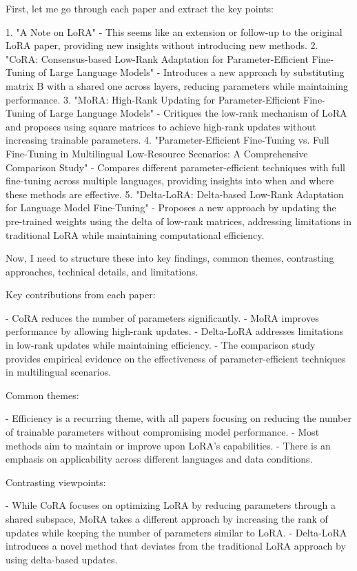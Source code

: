 \documentclass[conference]{IEEEtran}
\begin{document}
First, let me go through each paper and extract the key points:

1. "A Note on LoRA" - This seems like an extension or follow-up to the original LoRA paper, providing new insights without introducing new methods.
2. "CoRA: Consensus-based Low-Rank Adaptation for Parameter-Efficient Fine-Tuning of Large Language Models" - Introduces a new approach by substituting matrix B with a shared one across layers, reducing parameters while maintaining performance.
3. "MoRA: High-Rank Updating for Parameter-Efficient Fine-Tuning of Large Language Models" - Critiques the low-rank mechanism of LoRA and proposes using square matrices to achieve high-rank updates without increasing trainable parameters.
4. "Parameter-Efficient Fine-Tuning vs. Full Fine-Tuning in Multilingual Low-Resource Scenarios: A Comprehensive Comparison Study" - Compares different parameter-efficient techniques with full fine-tuning across multiple languages, providing insights into when and where these methods are effective.
5. "Delta-LoRA: Delta-based Low-Rank Adaptation for Language Model Fine-Tuning" - Proposes a new approach by updating the pre-trained weights using the delta of low-rank matrices, addressing limitations in traditional LoRA while maintaining computational efficiency.

Now, I need to structure these into key findings, common themes, contrasting approaches, technical details, and limitations.

Key contributions from each paper:

- CoRA reduces the number of parameters significantly.
- MoRA improves performance by allowing high-rank updates.
- Delta-LoRA addresses limitations in low-rank updates while maintaining efficiency.
- The comparison study provides empirical evidence on the effectiveness of parameter-efficient techniques in multilingual scenarios.

Common themes:

- Efficiency is a recurring theme, with all papers focusing on reducing the number of trainable parameters without compromising model performance.
- Most methods aim to maintain or improve upon LoRA's capabilities.
- There is an emphasis on applicability across different languages and data conditions.

Contrasting viewpoints:

- While CoRA focuses on optimizing LoRA by reducing parameters through a shared subspace, MoRA takes a different approach by increasing the rank of updates while keeping the number of parameters similar to LoRA.
- Delta-LoRA introduces a novel method that deviates from the traditional LoRA approach by using delta-based updates.
\end{document}
